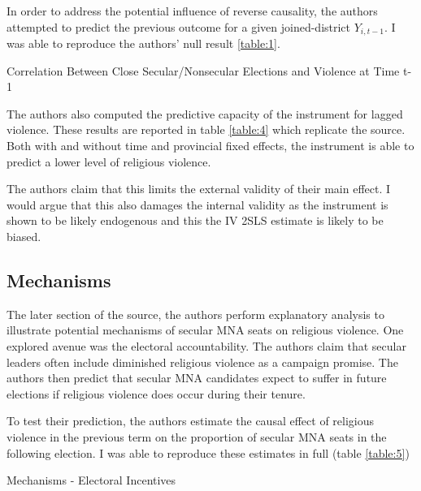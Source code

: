 \documentclass{scrartcl}
\begin{document}
In order to address the potential influence of reverse causality, the authors attempted to predict the previous outcome for a given joined-district $Y_{i,t-1}$.
I was able to reproduce the authors' null result \ref{table:1}.

\begin{table}[ht]
  \begin{center}
    \scalebox{0.75}{
      
    }
    \caption{Correlation Between Close Secular/Nonsecular Elections and Violence at Time t-1}
    \label{table:4}
  \end{center}
\end{table}

The authors also computed the predictive capacity of the instrument for lagged violence.
These results are reported in table \ref{table:4} which replicate the source.
Both with and without time and provincial fixed effects, the instrument is able to predict a lower level of religious violence.

The authors claim that this limits the external validity of their main effect. I would argue that this also damages the internal validity as the instrument is shown to be likely endogenous and this the IV 2SLS estimate is likely to be biased. 


\subsection{Mechanisms}

The later section of the source, the authors perform explanatory analysis to illustrate potential mechanisms of secular MNA seats on religious violence. One explored avenue was the electoral accountability. The authors claim that secular leaders often include diminished religious violence as a campaign promise. The authors then predict that secular MNA candidates expect to suffer in future elections if religious violence does occur during their tenure. 

To test their prediction, the authors estimate the causal effect of religious violence in the previous term on the proportion of secular MNA seats in the following election.
I was able to reproduce these estimates in full (table \ref{table:5})

\begin{table}[ht]
  \begin{center}
    \scalebox{0.75}{
      
    }
    \caption{Mechanisms - Electoral Incentives}
    \label{table:5}
  \end{center}
\end{table}
\end{document}
